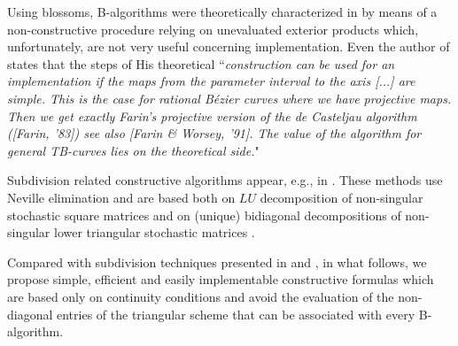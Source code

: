 \documentclass[b5paper, twosided]{book}
\begin{document}
Using blossoms, B-algorithms were theoretically  characterized in \cite[Theorem 2.4]{Pottmann1993} by means of a non-constructive procedure relying on unevaluated exterior products which, unfortunately, are not very useful concerning implementation. Even the author of \cite[Theorem 2.4]{Pottmann1993} states that the steps of His theoretical ``\textit{construction can be used for an implementation if the maps from the parameter interval to the axis [...] are simple. This is the case for rational B\'ezier curves where we have projective maps. Then we get exactly Farin's projective version of the de Casteljau algorithm ([Farin, '83]) see also [Farin \& Worsey, '91]. The value of the algorithm for general TB-curves lies on the theoretical side.}"

Subdivision related constructive algorithms appear, e.g., in \cite[Section 3]{MainarPena1999}. These methods use Neville elimination and are based both on $LU$ decomposition of non-singular stochastic square matrices and on (unique) bidiagonal decompositions of non-singular lower triangular stochastic matrices \cite[Theorem 4.5]{GascaPena1996}.

Compared with subdivision techniques presented in \cite[Theorem 2.4]{Pottmann1993} and \cite[Section 3]{MainarPena1999}, in what follows, we propose simple, efficient and easily implementable constructive formulas which are based only on continuity conditions and avoid the evaluation of the non-diagonal entries of the triangular scheme that can be associated with every B-algorithm.
\end{document}
